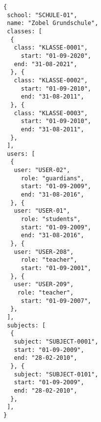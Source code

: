 
\begin{lstlisting}[caption={Schulen-Datenmodell Beispiel 1},frame=tlrb]
{
 school: "SCHULE-01",
 name: "Zobel Grundschule",
 classes: [ 
  {
   class: "KLASSE-0001",
	 start: "01-09-2020",
   end: "31-08-2021",
  }, {
   class: "KLASSE-0002",
	 start: "01-09-2010",
	 end: "31-08-2011",
  }, {
   class: "KLASSE-0003", 
	 start: "01-09-2010",
	 end: "31-08-2011",
  },
 ],
 users: [
  {
   user: "USER-02",
 	 role: "guardians",
	 start: "01-09-2009",
	 end: "31-08-2016",
  }, {
   user: "USER-01",
	 role: "students",
	 start: "01-09-2009",
	 end: "31-08-2016",
  }, {
   user: "USER-208",
	 role: "teacher",
	 start: "01-09-2001",
  }, {
   user: "USER-209",
 	role: "teacher",
 	 start: "01-09-2007",
  },
 ],
 subjects: [
  {
   subject: "SUBJECT-0001",
   start: "01-09-2009",
   end: "28-02-2010",
  }, {
   subject: "SUBJECT-0101",
   start: "01-09-2009",
   end: "28-02-2010",
  }, 
 ],
}
\end{lstlisting}